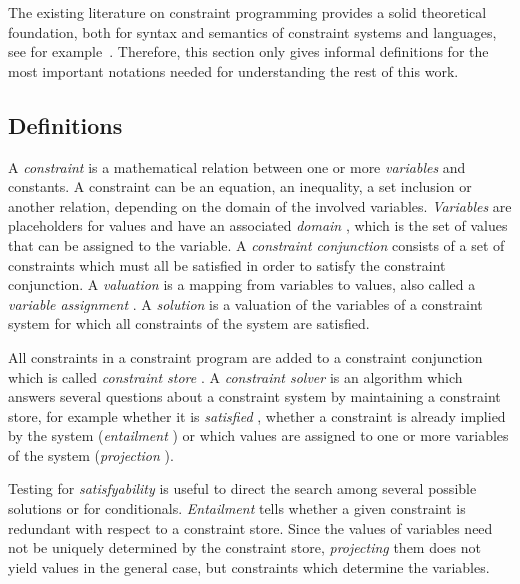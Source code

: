 The existing literature on constraint programming provides a solid
theoretical foundation, both for syntax and semantics of constraint
systems and languages, see for
example~\cite{marriot98programmingwithconstraints,jaffar87clp}.
Therefore, this section only gives informal definitions for the most
important notations needed for understanding the rest of this work.


\subsection{Definitions}

A {\em constraint}%
 is a mathematical relation between one or more {\em
  variables}%
 and constants.  A constraint can be an equation, an
inequality, a set inclusion%
 or another relation, depending on the
domain of the involved variables.  {\em Variables} are placeholders
for values and have an associated {\em domain}%
, which is the set of
values that can be assigned to the variable.  A {\em constraint
  conjunction}%
%
 consists of a set of constraints which must all be
satisfied in order to satisfy the constraint conjunction.  A {\em
  valuation}%
 is a mapping from variables to values, also called a
{\em
  variable assignment}%
%
.  A {\em solution}%
 is a valuation of the variables of a constraint
system for which all constraints of the system are satisfied.

All constraints in a constraint program are added to a constraint
conjunction which is called {\em constraint store}%
%
.  A {\em constraint
  solver}%
%
 is an algorithm which answers several
questions about a constraint system by maintaining a constraint store,
for example whether it is {\em satisfied}%
, whether a constraint is
already implied by the system ({\em entailment}%
) or which values are
assigned to one or more variables of the system ({\em projection}%
).

Testing for {\em satisfyability}%
 is useful to direct the search among
several possible solutions or for conditionals.  {\em Entailment}%
 tells whether a given constraint is redundant with
respect to a constraint store.  Since the values of variables need not
be uniquely determined by the constraint store, {\em projecting} them
does not yield values in the general case, but constraints which
determine the variables.

